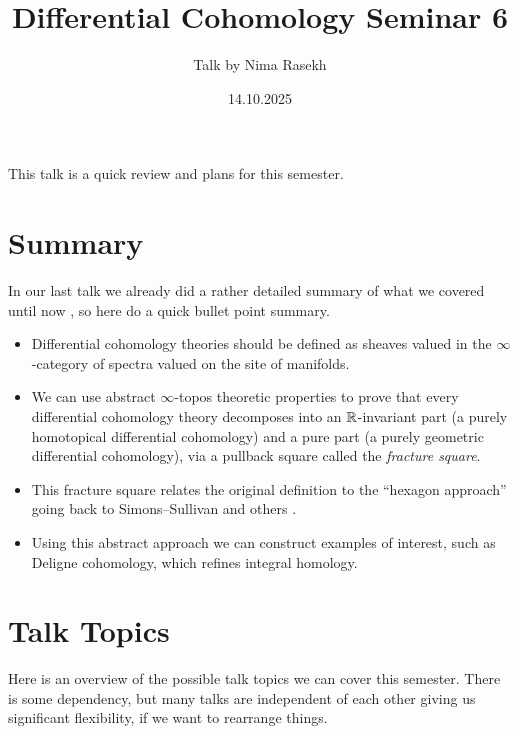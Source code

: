 \documentclass[10pt]{amsart}
\title{Differential Cohomology Seminar 6}
\date{14.10.2025}
\author{Talk by Nima Rasekh}
\begin{document}
\maketitle

This talk is a quick review and plans for this semester.


\section{Summary}
In our last talk we already did a rather detailed summary of what we covered until now \cite{rasekh2025diffcoh5}, so here do a quick bullet point summary.
\begin{itemize}
  \item Differential cohomology theories should be defined as sheaves valued in the $\infty$-category of spectra valued on the site of manifolds. 
  \item We can use abstract $\infty$-topos theoretic properties to prove that every differential cohomology theory decomposes into an $\mathbb{R}$-invariant part (a purely homotopical differential cohomology) and a pure part (a purely geometric differential cohomology), via a pullback square called the \emph{fracture square}. 
  \item This fracture square relates the original definition to the ``hexagon approach'' going back to Simons--Sullivan and others \cite{simonssullivan2008diffcoh,bunkeschick2009smoothk}.
  \item Using this abstract approach we can construct examples of interest, such as Deligne cohomology, which refines integral homology.
\end{itemize}

\section{Talk Topics}
Here is an overview of the possible talk topics we can cover this semester. There is some dependency, but many talks are independent of each other giving us significant flexibility, if we want to rearrange things.
\end{document}

